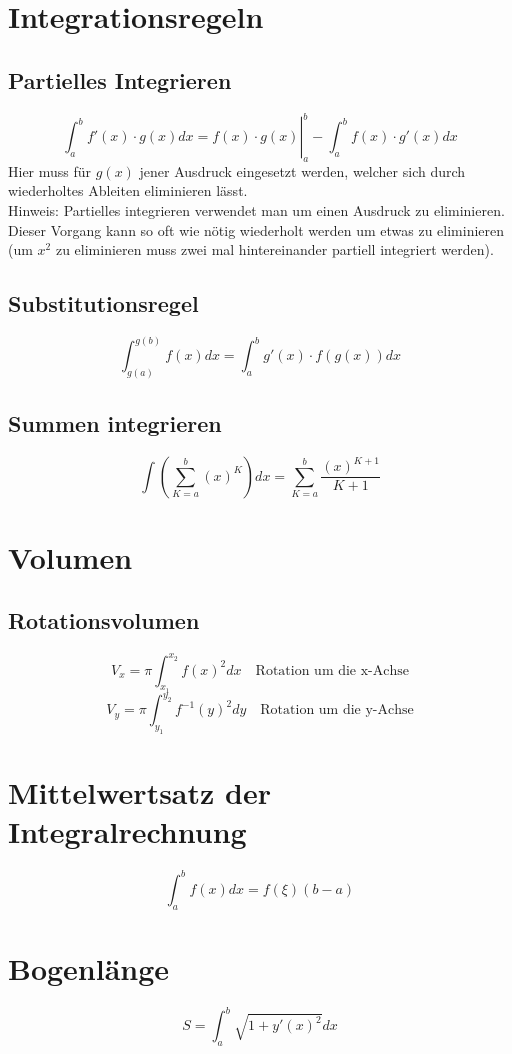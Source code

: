 \section{Integrationsregeln}
\subsection{Partielles Integrieren}
\[ \boxed{\left. \int_a^b f'(x) \cdot g(x) dx = f(x) \cdot g(x) \right|_a^b - \int_a^b f(x) \cdot g'(x) dx} \]
Hier muss für $g(x)$ jener Ausdruck eingesetzt werden, welcher sich durch wiederholtes Ableiten eliminieren lässt.\\
Hinweis: Partielles integrieren verwendet man um einen Ausdruck zu eliminieren.
Dieser Vorgang kann so oft wie nötig wiederholt werden um etwas zu eliminieren (um $x^2$ zu eliminieren muss zwei mal hintereinander partiell integriert werden).
\subsection{Substitutionsregel}
\[ \boxed{\int_{g(a)}^{g(b)} f(x) dx = \int_{a}^{b} g'(x) \cdot f(g(x)) dx} \]

\subsection{Summen integrieren}
\[ \boxed{ \int \left( \sum_{K=a}^{b} (x)^K \right) dx= \sum_{K=a}^b \frac{(x)^{K+1}}{K+1} } \]

\section{Volumen}
\subsection{Rotationsvolumen}
\[ \boxed{V_x = \pi \int_{x_1}^{x_2} f(x)^2 dx} \quad \text{Rotation um die x-Achse}\]
\[ \boxed{V_y = \pi \int_{y_1}^{y_2} f^{-1}(y)^2 dy} \quad \text{Rotation um die y-Achse}\]

\section{Mittelwertsatz der Integralrechnung}
\[ \boxed{\int_{a}^{b} f(x) dx = f(\xi)(b-a)} \]

\section{Bogenlänge}
\[ \boxed{S = \int_{a}^{b} \sqrt{1 + y'(x)^2} dx} \]

